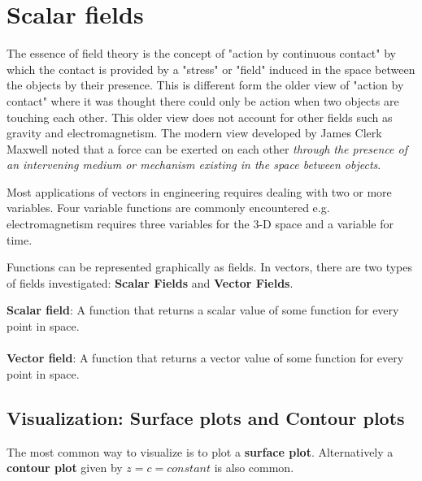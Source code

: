 \documentclass[10pt,a4paper]{article}
\begin{document}
\section{Scalar fields}

The essence of field theory is the concept of "action by continuous contact" by which the contact is
provided by a "stress" or "field" induced in the space between the objects by their presence. This
is different form the older view of "action by contact" where it was thought there could only be
action when two objects are touching each other. This older view does not account for other fields
such as gravity and electromagnetism. The modern view developed by James Clerk Maxwell noted that a
force can be exerted on each other \textit{through the presence of an intervening medium or
mechanism existing in the space between objects}. \par

Most applications of vectors in engineering requires dealing with two or more variables. Four
variable functions are commonly encountered e.g. electromagnetism requires three variables for the
3-D space and a variable for time. 

Functions can be represented graphically as fields. In vectors, there are two types of fields
investigated: \textbf{Scalar Fields} and \textbf{Vector Fields}.

\begin{tcolorbox}[breakable,colback=white]
\textbf{Scalar field}: A function that returns a scalar value of some function for every point in
space. 
\\
\\
\textbf{Vector field}: A function that returns a vector value of some function for every point in
space. 
\end{tcolorbox}

\subsection{Visualization: Surface plots and Contour plots}

The most common way to visualize is to plot a \textbf{surface plot}. Alternatively a \textbf{contour plot} given by $z=c=constant$ is also common.\par 
\end{document}
